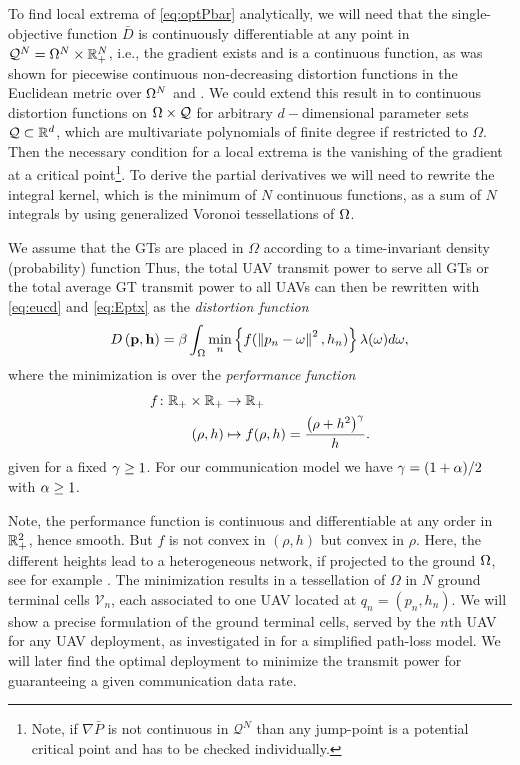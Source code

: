 \documentclass[smallabstract,smallcaptions]{dccpaper}
\newcommand{\disfunction}{distortion function}
\newcounter{example}[section]
\newcommand{\df}{\ensuremath{\lam}}         %
\newcommand{\bP}{\ensuremath{\vp}}          %
\newcommand{\bH}{\ensuremath{\vh}}          %
\newcommand{\Pbar}{\ensuremath{\bar{P}}}         %
\newcommand{\Vor}{\ensuremath{\mathcal{V}}}         %
\newcommand{\Qset}{\ensuremath{\mathcal Q}}
\newcommand{\Dis}{\ensuremath{D}}                    %
\newcommand{\AvDis}{\ensuremath{\bar{\Dis}}}         %
\begin{document}
To find local extrema of \eqref{eq:optPbar} analytically, we will need that the single-objective function $\AvDis$ is
continuously differentiable at any point in $\Qset^N=\Omega^N\times \R_+^N$, i.e., the gradient exists and is a
continuous function, as was shown for piecewise continuous non-decreasing distortion functions in the Euclidean metric
over $\Omega^N$ \cite[Thm.2.2]{CMB05} and \cite{GJ16a}. We could extend this result in \cite{WJ18} to continuous
\disfunction s on $\Ome\times\Qset$ for arbitrary $d-$dimensional parameter sets $\Qset\subset \R^d$, which are
multivariate polynomials of finite degree if restricted to $\Omega$.  Then the necessary condition for a local extrema
is the vanishing of the gradient at a critical point\footnote{Note, if $\nabla \Pbar$ is not continuous in $\Qset^N$
than any jump-point is a potential critical point and has to be checked individually.}.  To derive the partial
derivatives we will need to rewrite the integral kernel, which is the minimum of $N$ continuous functions, as a sum of
$N$ integrals by using  generalized Voronoi tessellations of $\Omega$.
%





We assume that the GTs  are placed in $\Omega$ according to a time-invariant density (probability) function
  Thus, the total
UAV transmit power to serve all GTs or the total average GT transmit power to all UAVs can then be rewritten with
\eqref{eq:eucd} and \eqref{eq:Eptx} as the \emph{distortion function}
%
\begin{equation}
  D\left(\bP,\bH\right)=\bet\int_{\Omega}\min_{n} \left\{ f(\Norm{p_n-\ome}^2,h_n) \right\} \df(\omega)d\omega,
 \label{obj0}
\end{equation}
%
where the minimization is over the \emph{performance function}
%
\begin{align}
 f \colon {\ensuremath{\mathbb R}}_+\times {\ensuremath{\mathbb R}}_+ &\to {\ensuremath{\mathbb R}}_+\\
           (\rho,h)&\mapsto f(\rho,h)=\frac{\left(\rho+h^2\right)^{\gamma}}{h}.
\end{align}
%
given for a fixed $\gamma\geq 1$. For our communication model we have $\gamma=(1+\alpha)/2$ with $\alpha\geq 1$.

Note, the performance function is continuous and differentiable at any order in ${\mathbb R}^2_+$, hence smooth. But $f$ is not
convex in $(\rho,h)$ but convex in $\rho$. 
Here, the different heights lead to a heterogeneous network, if projected to the ground $\Omega$, see for example
\cite{GJ16a}.  The minimization results in a tessellation of $\Omega$ in $N$ ground terminal cells $\Vor_n$, each
associated to one UAV located at $q_n=(p_n,h_n)$.  We will show a precise formulation of the ground terminal cells,
served by the $n$th UAV for any UAV deployment, as investigated in \cite{MSBD16b} for a simplified path-loss model. We
will later find the optimal deployment to minimize the transmit power for guaranteeing a given communication data rate.
%
\fi
\end{document}
